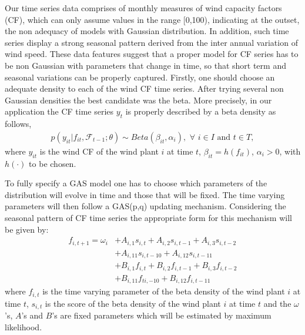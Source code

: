 \documentclass[a4paper]{IEEEtran}
\begin{document}
Our time series data comprises of monthly measures of wind capacity factors (CF), which can only assume values in the range [0,100), indicating at the outset, the non adequacy of models with Gaussian distribution. In addition, such time series display a strong seasonal pattern derived from the inter annual variation of wind speed. These data features suggest that a proper model for CF series has to be non Gaussian with parameters that change in time, so that short term and seasonal variations can be properly captured. Firstly, one should choose an adequate density to each of the wind CF time series. %
After trying several non Gaussian densities the best candidate was the beta. More precisely, in our application the CF time series $y_t$ is properly described by a beta density as follows,
\begin{eqnarray}
p(y_{it}|f_{it},\mathcal{F}_{t-1};\theta) \sim Beta\left(\beta_{it},\alpha_{i}\right),\,\,\forall\,\, i \in I \,\, \mbox{and}\,\, t \in T, \label{beta_dens}
\end{eqnarray}
\noindent
where $y_{it}$ is the wind CF of the wind plant $i$ at time $t$, $\beta_{it}=h(f_{it})$, $\alpha_i>0$, with $h(\cdot)$ to be chosen.

To fully specify a GAS model one has to choose which parameters of the distribution will evolve in time and those that will be fixed. The time varying parameters will then follow a GAS(p,q) updating mechanism. Considering the seasonal pattern of CF time series the appropriate form for this mechanism will be given by:
\begin{equation}
\begin{split}
f_{i,t+1}=\omega_{i}&+A_{i,1}s_{i,t}+A_{i,2}s_{i,t-1}+A_{i,3}s_{i,t-2}\\
&+A_{i,11}s_{i,t-10}+A_{i,12}s_{i,t-11}\\
&+B_{i,1}f_{i,t}+B_{i,2}f_{i,t-1}+B_{i,3}f_{i,t-2}\\
&+B_{i,11}f_{ti,-10}+B_{i,12}f_{i,t-11}\label{eq:2}
\end{split}
\end{equation}
\noindent
where $f_{i,t}$ is the time varying parameter of the beta density of the wind plant $i$ at time $t$, $s_{i,t}$ is the score of the beta density of the wind plant $i$ at time $t$ and the $\omega$'s, $A$'s and $B$'s are fixed parameters which will be estimated by maximum likelihood.
\end{document}
